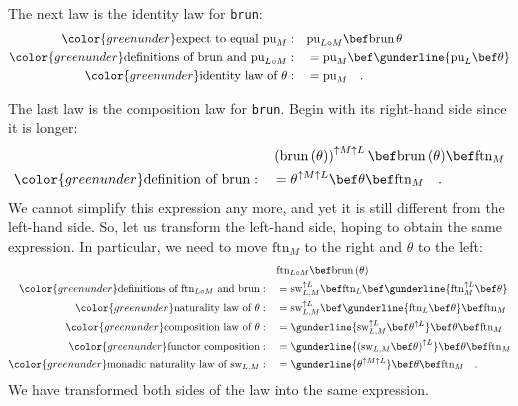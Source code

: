 The next law is the identity law for \lstinline!brun!:
\begin{align*}
{\color{greenunder}\text{expect to equal }\text{pu}_{M}:}\quad & \text{pu}_{L\circ M}\bef\text{brun}\,\theta\\
{\color{greenunder}\text{definitions of }\text{brun}\text{ and }\text{pu}_{L\circ M}:}\quad & =\text{pu}_{M}\bef\gunderline{\text{pu}_{L}\bef\theta}\\
{\color{greenunder}\text{identity law of }\theta:}\quad & =\text{pu}_{M}\quad.
\end{align*}

The last law is the composition law for \lstinline!brun!. Begin with
its right-hand side since it is longer:
\begin{align*}
 & \left(\text{brun}\,(\theta)\right)^{\uparrow M\uparrow L}\bef\text{brun}\,(\theta)\bef\text{ftn}_{M}\\
{\color{greenunder}\text{definition of }\text{brun}:}\quad & =\theta^{\uparrow M\uparrow L}\bef\theta\bef\text{ftn}_{M}\quad.
\end{align*}
We cannot simplify this expression any more, and yet it is still different
from the left-hand side. So, let us transform the left-hand side,
hoping to obtain the same expression. In particular, we need to move
$\text{ftn}_{M}$ to the right and $\theta$ to the left: 
\begin{align*}
 & \text{ftn}_{L\circ M}\bef\text{brun}\,(\theta)\\
{\color{greenunder}\text{definitions of }\text{ftn}_{L\circ M}\text{ and }\text{brun}:}\quad & =\text{sw}_{L,M}^{\uparrow L}\bef\text{ftn}_{L}\bef\gunderline{\text{ftn}_{M}^{\uparrow L}\bef\theta}\\
{\color{greenunder}\text{naturality law of }\theta:}\quad & =\text{sw}_{L,M}^{\uparrow L}\bef\gunderline{\text{ftn}_{L}\bef\theta}\bef\text{ftn}_{M}\\
{\color{greenunder}\text{composition law of }\theta:}\quad & =\gunderline{\text{sw}_{L,M}^{\uparrow L}\bef\theta^{\uparrow L}}\bef\theta\bef\text{ftn}_{M}\\
{\color{greenunder}\text{functor composition}:}\quad & =\gunderline{\left(\text{sw}_{L,M}\bef\theta\right)^{\uparrow L}}\bef\theta\bef\text{ftn}_{M}\\
{\color{greenunder}\text{monadic naturality law of }\text{sw}_{L,M}:}\quad & =\gunderline{\theta^{\uparrow M\uparrow L}}\bef\theta\bef\text{ftn}_{M}\quad.
\end{align*}
We have transformed both sides of the law into the same expression.

